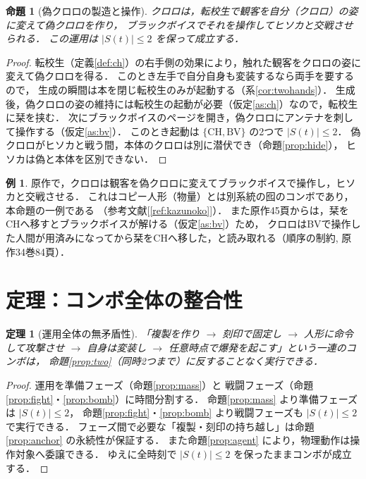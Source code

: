 \documentclass[a4paper,12pt]{jarticle}
\theoremstyle{definition}
\theoremstyle{plain}
\newtheorem{prop}{命題}
\newtheorem{thm}{定理}
\theoremstyle{definition}
\newtheorem{ex}{例}
\theoremstyle{remark}
\newcommand{\Act}{S}   %
\newcommand{\BV}{\mathrm{BV}}    %
\newcommand{\CH}{\mathrm{CH}}    %
\begin{document}
\begin{prop}[偽クロロの製造と操作]\label{prop:fake}
クロロは，転校生で観客を{自分（クロロ）の姿}に変えて{偽クロロ}を作り，
ブラックボイスでそれを操作してヒソカと交戦させられる．
この運用は $|\Act(t)|\le2$ を保って成立する．
\end{prop}

\begin{proof}
転校生（定義\ref{def:ch}）の右手側の効果により，触れた観客をクロロの姿に変えて偽クロロを得る．
このとき左手で自分自身も変装するなら両手を要するので，
生成の瞬間は本を閉じ転校生のみが起動する（系\ref{cor:twohands}）．
生成後，偽クロロの姿の維持には転校生の起動が必要（仮定\ref{as:ch}）なので，転校生に栞を挟む．
次にブラックボイスのページを開き，偽クロロにアンテナを刺して操作する（仮定\ref{as:bv}）．
このとき起動は $\{\CH,\BV\}$ の2つで $|\Act(t)|\le2$．
偽クロロがヒソカと戦う間，本体のクロロは別に潜伏でき（命題\ref{prop:hide}），
ヒソカは偽と本体を区別できない．
\end{proof}

\begin{ex}
原作で，クロロは観客を偽クロロに変えてブラックボイスで操作し，ヒソカと交戦させる．
これはコピー人形（物量）とは別系統の{囮}のコンボであり，本命題の一例である
（参考文献[\ref{ref:kazunoko}]）．
また原作45頁からは，栞をCHへ移すとブラックボイスが解ける（仮定\ref{as:bv}）ため，
クロロは{BVで操作した人間が用済みになってから}栞をCHへ移した，と読み取れる（順序の制約, 原作34巻84頁）．
\end{ex}

\section{定理：コンボ全体の整合性}

\begin{thm}[運用全体の無矛盾性]\label{thm:main}
「複製を作り $\to$ 刻印で固定し $\to$ 人形に命令して攻撃させ $\to$ 自身は変装し $\to$
任意時点で爆発を起こす」という一連のコンボは，
命題\ref{prop:two}（同時2つまで）に反することなく実行できる．
\end{thm}

\begin{proof}
運用を{準備フェーズ}（命題\ref{prop:mass}）と
{戦闘フェーズ}（命題\ref{prop:fight}・\ref{prop:bomb}）に時間分割する．
命題\ref{prop:mass} より準備フェーズは $|\Act(t)|\le2$，
命題\ref{prop:fight}・\ref{prop:bomb} より戦闘フェーズも $|\Act(t)|\le2$ で実行できる．
フェーズ間で必要な「複製・刻印の持ち越し」は命題\ref{prop:anchor} の永続性が保証する．
また命題\ref{prop:agent} により，物理動作は操作対象へ委譲できる．
ゆえに全時刻で $|\Act(t)|\le2$ を保ったままコンボが成立する．
\end{proof}
\end{document}

